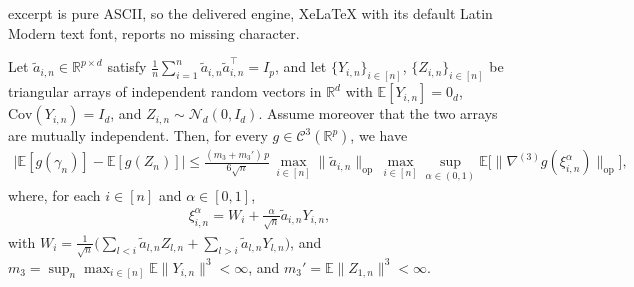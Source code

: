 \documentclass[10pt,a4paper]{amsart}
\newcommand{\Ee}{{\mathbb{E}}}
\newcommand{\op}{\mathrm{op}}
\newcommand{\real}{\mathbb{R}}
\begin{document}
excerpt is pure ASCII, so the delivered engine, XeLaTeX with its default Latin Modern text font, reports no missing character.
\begin{lemma}
\label{lem:lindeberg-swap}
Let $\widetilde a_{i,n}\in\real^{p\times d}$ satisfy
$\frac1n\sum_{i=1}^n\widetilde a_{i,n}\widetilde a_{i,n}^\top=I_p$, and let
$\{Y_{i,n}\}_{i\in[n]}$, $\{Z_{i,n}\}_{i\in[n]}$ be triangular arrays of
independent random vectors in $\real^d$ with $\Ee[Y_{i,n}]=0_d$,
$\mathrm{Cov}(Y_{i,n})=I_d$, and $Z_{i,n}\sim\mathcal N_d(0,I_d)$.
Assume moreover that the two arrays are mutually independent.
Then, for every $g\in\mathcal C^3(\real^p)$, we have
\begin{align*}
  \big|\Ee[g(\gamma_n)]-\Ee[g(Z_n)]\big|
  \le\frac{(m_3+m_3')\,p}{6\sqrt n}\,
     \max_{i\in[n]}\|\widetilde a_{i,n}\|_{\op}\,
     \max_{i\in[n]}\sup_{\alpha\in(0,1)}
     \Ee\big[\|\nabla^{(3)}g(\xi^\alpha_{i,n})\|_{\op}\big],
\end{align*}
where, for each $i\in[n]$ and $\alpha\in[0,1]$, 
\begin{align}
  \label{eq:interpolation}
  \xi^{\alpha}_{i,n}=W_i+\frac{\alpha}{\sqrt n}\widetilde a_{i,n}Y_{i,n},
\end{align}
with $W_i=\frac{1}{\sqrt n}\Big(\sum_{l<i}\widetilde a_{l,n}Z_{l,n}
     +\sum_{l>i}\widetilde a_{l,n}Y_{l,n}\Big)$, and
$m_3=\sup_n\max_{i\in[n]}\Ee\|Y_{i,n}\|^3<\infty$,
and 
$m_3'=\Ee\|Z_{1,n}\|^3<\infty$.
\end{lemma}
\end{document}
